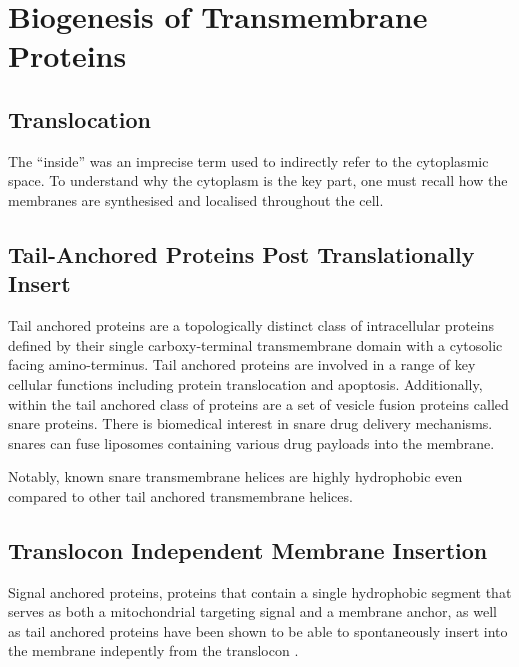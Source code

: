 \section{Biogenesis of Transmembrane Proteins}
\subsection{Translocation}
The ``inside'' was an imprecise term used to indirectly refer to the cytoplasmic space. To understand why the cytoplasm is the key part, one must recall how the membranes are synthesised and localised throughout the cell.

\subsection{Tail-Anchored Proteins Post Translationally Insert}

Tail anchored proteins are a topologically distinct class of intracellular proteins defined by their single carboxy-terminal transmembrane domain with a cytosolic facing amino-terminus. Tail anchored proteins are involved in a range of key cellular functions including protein translocation and apoptosis. Additionally, within the tail anchored class of proteins are a set of vesicle fusion proteins called \gls{snare} proteins. There is biomedical interest in \gls{snare} drug delivery mechanisms. \gls{snare}s can fuse liposomes containing various drug payloads into the membrane.

Notably, known \gls{snare} transmembrane helices are highly hydrophobic even compared to other tail anchored transmembrane helices.

\subsection{Translocon Independent Membrane Insertion}
Signal anchored proteins, proteins that contain a single hydrophobic segment that serves as both a mitochondrial targeting signal and a membrane anchor, as well as tail anchored proteins have been shown to be able to spontaneously insert into the membrane indepently from the translocon \cite{Elisa2012, Lan2000, Colombo2009}.

